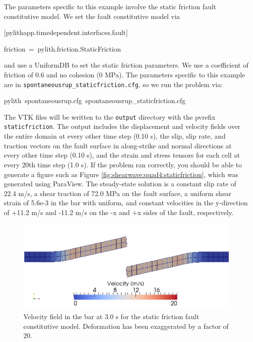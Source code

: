 The parameters specific to this example involve the static friction
fault constitutive model. We set the fault constitutive model via
\begin{lyxcode}
{[}pylithapp.timedependent.interfaces.fault{]}

friction~=~pylith.friction.StaticFriction
\end{lyxcode}
and use a UniformDB to set the static friction parameters. We use
a coefficient of friction of 0.6 and no cohesion (0 MPa). The parameters
specific to this example are in \texttt{spontaneousrup\_staticfriction.cfg},
so we run the problem via:
\begin{lyxcode}
pylith~spontaneousrup.cfg~spontaneousrup\_staticfriction.cfg
\end{lyxcode}
The VTK files will be written to the \texttt{output} directory with
the pvrefix \texttt{staticfriction}. The output includes the displacement
and velocity fields over the entire domain at every other time step
(0.10 s), the slip, slip rate, and traction vectors on the fault surface
in along-strike and normal directions at every other time step (0.10
s), and the strain and stress tensors for each cell at every 20th
time step (1.0 s). If the problem ran correctly, you should be able
to generate a figure such as Figure \vref{fig:shearwave:quad4:staticfriction},
which was generated using ParaView. The steady-state solution is a
constant slip rate of 22.4 m/s, a shear traction of 72.0 MPa on the
fault surface, a uniform shear strain of 5.6e-3 in the bar with uniform,
and constant velocities in the y-direction of +11.2 m/s and -11.2
m/s on the -x and +x sides of the fault, respectively.

\noindent \begin{center}
\begin{figure}
\begin{centering}
\includegraphics[scale=0.5]{tutorials/shearwave/figs/quad4staticfriction30}
\par\end{centering}

\caption{Velocity field in the bar at 3.0 s for the static friction fault constitutive
model. Deformation has been exaggerated by a factor of 20.\label{fig:shearwave:quad4:staticfriction}}
\end{figure}

\par\end{center}


